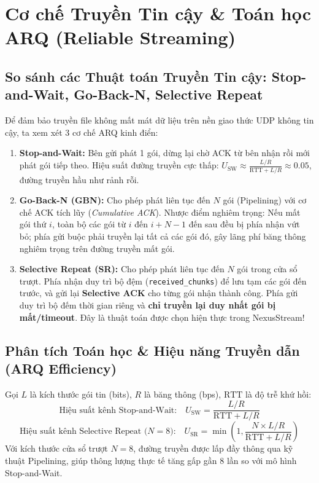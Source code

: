 \documentclass[11pt,a4paper]{article}
\begin{document}
\newpage

\section{Cơ chế Truyền Tin cậy \& Toán học ARQ (Reliable Streaming)}

\subsection{So sánh các Thuật toán Truyền Tin cậy: Stop-and-Wait, Go-Back-N, Selective Repeat}
Để đảm bảo truyền file không mất mát dữ liệu trên nền giao thức UDP không tin cậy, ta xem xét 3 cơ chế ARQ kinh điển:
\begin{enumerate}
    \item \textbf{Stop-and-Wait:} Bên gửi phát 1 gói, dừng lại chờ ACK từ bên nhận rồi mới phát gói tiếp theo. Hiệu suất đường truyền cực thấp: $U_{\text{SW}} \approx \frac{L/R}{\text{RTT} + L/R} \approx 0.05$, đường truyền hầu như rảnh rỗi.
    \item \textbf{Go-Back-N (GBN):} Cho phép phát liên tục đến $N$ gói (Pipelining) với cơ chế ACK tích lũy (\textit{Cumulative ACK}). Nhược điểm nghiêm trọng: Nếu mất gói thứ $i$, toàn bộ các gói từ $i$ đến $i+N-1$ đến sau đều bị phía nhận vứt bỏ; phía gửi buộc phải truyền lại tất cả các gói đó, gây lãng phí băng thông nghiêm trọng trên đường truyền mất gói.
    \item \textbf{Selective Repeat (SR):} Cho phép phát liên tục đến $N$ gói trong cửa sổ trượt. Phía nhận duy trì bộ đệm (\texttt{received\_chunks}) để lưu tạm các gói đến trước, và gửi lại \textbf{Selective ACK} cho từng gói nhận thành công. Phía gửi duy trì bộ đếm thời gian riêng và \textbf{chỉ truyền lại duy nhất gói bị mất/timeout}. Đây là thuật toán được chọn hiện thực trong NexusStream!
\end{enumerate}

\subsection{Phân tích Toán học & Hiệu năng Truyền dẫn (ARQ Efficiency)}
Gọi $L$ là kích thước gói tin (bits), $R$ là băng thông (bps), $\text{RTT}$ là độ trễ khứ hồi:
$$\text{Hiệu suất kênh Stop-and-Wait:}\quad U_{\text{SW}} = \frac{L/R}{\text{RTT} + L/R}$$
$$\text{Hiệu suất kênh Selective Repeat ($N=8$):}\quad U_{\text{SR}} = \min\left(1, \frac{N \times L/R}{\text{RTT} + L/R}\right)$$
Với kích thước cửa sổ trượt $N=8$, đường truyền được lấp đầy thông qua kỹ thuật Pipelining, giúp thông lượng thực tế tăng gấp gần 8 lần so với mô hình Stop-and-Wait.
\end{document}
